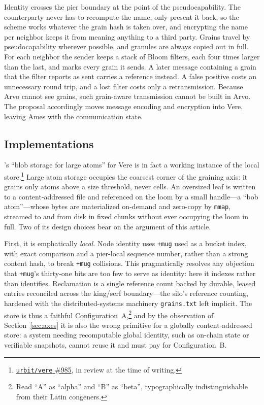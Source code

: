 \documentclass[twoside]{article}
\begin{document}
Identity crosses the pier boundary at the point of the pseudocapability.  The counterparty never has to recompute the name, only present it back, so the scheme works whatever the grain hash is taken over, and encrypting the name per neighbor keeps it from meaning anything to a third party.  Grains travel by pseudocapability wherever possible, and granules are always copied out in full.  For each neighbor the sender keeps a stack of Bloom filters, each four times larger than the last, and marks every grain it sends.  A later message containing a grain that the filter reports as sent carries a reference instead.  A false positive costs an unnecessary round trip, and a lost filter costs only a retransmission.  Because Arvo cannot see grains, such grain-aware transmission cannot be built in Arvo.  The proposal accordingly moves message encoding and encryption into Vere, leaving Ames with the communication state.

\subsection{Implementations}
\label{sec:silo-impl}

's ``blob storage for large atoms'' for Vere is in fact a working instance of the local store.\footnote{\href{https://github.com/urbit/vere/pull/985}{\texttt{urbit/vere} \#985}, in review at the time of writing.}  Large atom storage occupies the coarsest corner of the graining axis:  it grains only atoms above a size threshold, never cells.  An oversized leaf is written to a content-addressed file and referenced on the loom by a small handle---a ``bob atom''---whose bytes are materialized on-demand and zero-copy by \texttt{mmap}, streamed to and from disk in fixed chunks without ever occupying the loom in full.  Two of its design choices bear on the argument of this article.

First, it is emphatically \emph{local}.  Node identity uses \texttt{+mug} used as a bucket index, with exact comparison and a pier-local sequence number, rather than a strong content hash, to break \texttt{+mug} collisions.  This pragmatically resolves any objection that \texttt{+mug}'s thirty-one bits are too few to serve as identity:  here it indexes rather than identifies.  Reclamation is a single reference count backed by durable, leased entries reconciled across the king/serf boundary---the silo's reference counting, hardened with the distributed-systems machinery \texttt{grains.txt} left implicit.  The store is thus a faithful Configuration~A,\footnote{Read ``A'' as ``alpha'' and ``B'' as ``beta'', typographically indistinguishable from their Latin congeners.} and by the observation of Section~\ref{sec:axes} it is also the wrong primitive for a globally content-addressed store:  a system needing recomputable global identity, such as on-chain state or verifiable snapshots, cannot reuse it and must pay for Configuration~B.
\end{document}
